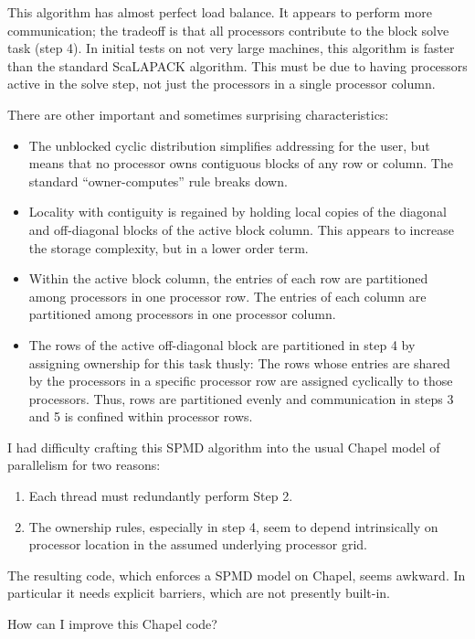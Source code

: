 \documentclass[10pt]{article}
\begin{document}
This algorithm has almost perfect load balance.  It appears to perform more
communication; the tradeoff is that all processors contribute to the block solve
task (step 4).  In initial tests on not very large machines, this algorithm is
faster than the standard ScaLAPACK algorithm. This must be due to having
processors active in the solve step, not just the processors in a single
processor column.

There are other important and sometimes surprising characteristics:

\begin{itemize}
\item The unblocked cyclic distribution simplifies addressing for the user, but
  means that no processor owns contiguous blocks of any row or column.  The
  standard ``owner-computes'' rule breaks down.
\item Locality with contiguity is regained by holding local copies of the
  diagonal and off-diagonal blocks of the active block column.  This appears to
  increase the storage complexity, but in a lower order term.
\item Within the active block column, the entries of each row are partitioned
  among processors in one processor row.  The entries of each column are
  partitioned among processors in one processor column.
\item The rows of the active off-diagonal block are partitioned in step 4 by
  assigning ownership for this task thusly: The rows whose entries are shared by
  the processors in a specific processor row are assigned cyclically to those
  processors.  Thus, rows are partitioned evenly and communication in steps 3
  and 5 is confined within processor rows.
\end{itemize}

I had difficulty crafting this SPMD algorithm into the usual Chapel model of
parallelism for two reasons:
\begin{enumerate}
\item Each thread must redundantly perform Step 2.
\item The ownership rules, especially in step 4, seem to depend intrinsically on
  processor location in the assumed underlying processor grid.
\end{enumerate}
The resulting code, which enforces a SPMD model on Chapel, seems awkward.  In
particular it needs explicit barriers, which are not presently built-in.

How can I improve this Chapel code?

  
\end{document}
